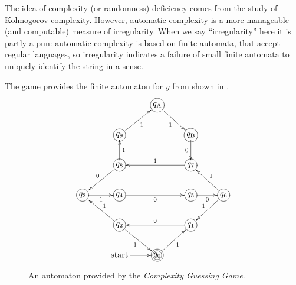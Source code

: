 	The idea of complexity (or randomness) deficiency comes from the study of Kolmogorov complexity.
	However, automatic complexity is a more manageable (and computable) measure of irregularity.
	When we say ``irregularity'' here it is partly a pun:
	automatic complexity is based on finite automata, that accept regular languages,
	so irregularity indicates a failure of small finite automata to uniquely identify the string in a sense.

	The game provides the finite automaton for $y$ from  shown in .
	\begin{figure}
		\centering
		\[
			\xymatrix{
									&								& *+[Fo]{q_{\mathrm A}}\ar[dr]_1   &			   &\\
									& *+[Fo]{q_9}\ar[ur]_1			&				   & *+[Fo]{q_{\mathrm B}}\ar[d]_0  \\
									& *+[Fo]{q_8}\ar[u]_1\ar[dl]_0	&				   & *+[Fo]{q_7}\ar[ll]_1			\\
				*+[Fo]{q_3}\ar[r]_1 & *+[Fo]{q_4}\ar[rr]_0			&				   & *+[Fo]{q_5}\ar[r]_0		   & *+[Fo]{q_6}\ar[ul]_1\ar[dl]_1\\
									& *+[Fo]{q_2}\ar[ul]_1\ar[dr]_1	&				   & *+[Fo]{q_1}\ar[ll]_0		   & \\
									&\text{start}\ar[r]				& *+[Foo]{q_0}\ar[ur]_1
			}
\]

		\caption{An automaton provided by the \emph{Complexity Guessing Game}.}\label{y-automaton}
	\end{figure}
